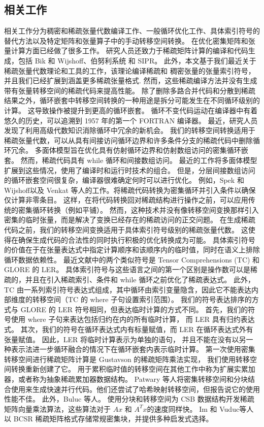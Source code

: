\begin{translation}
\section{相关工作}
相关工作分为稠密和稀疏张量代数编译工作、一般循环优化工作、具体索引符号的替代方法以及特定矩阵和张量算子中的手动转移空间转换。 在优化密集矩阵和张量计算方面已经做了很多工作。
研究人员还致力于稀疏矩阵计算的编译和代码生成，包括 Bik 和 Wijshoff、伯努利系统 和 SIPR。 此外，本文基于我们最近关于稀疏张量代数理论和工具的工作，该理论编译稀疏和
稠密张量的张量索引符号，并且我们已经扩展到涵盖更多稀疏张量格式. 然而，这些稀疏编译方法并没有生成带有张量转移空间的稀疏代码来提高性能。 
除了删除多路合并代码和分散到稀疏结果之外，循环嵌套中转移空间转换的一种用途是拆分可能发生在不同循环级别的计算。 这导致操作被提升到更高的循环嵌套。 
循环不变代码运动在编译器中有着悠久的历史，可以追溯到 1957 年的第一个 FORTRAN 编译器。 最近，研究人员发现了利用高级代数知识消除循环中冗余的新机会。 
我们的转移空间转换适用于稀疏张量代数，可以从具有间接访问循环边界和许多条件分支的稀疏代码中删除循环冗余。 
多面体模型旨在优化具有仿射循环边界和仿射数组访问的密集循环嵌套。 然而，稀疏代码具有 while 循环和间接数组访问。
最近的工作将多面体模型扩展到这些情况，使用了编译时和运行时技术的组合。 但是，分层间接数组访问的循环嵌套空间很复杂，编译器很难确定何时可以进行优化。 
例如，Spek 和 Wijshoff以及 Venkat 等人的工作。将稀疏代码转换为密集循环并引入条件以确保仅计算非零条目。 
这样，在将代码转换回对稀疏结构进行操作之前，可以应用传统的密集循环转换（例如平铺）。 
然而，这种技术并没有像转移空间变换那样引入密集的临时张量，而是解决了变换已经存在的稀疏访问的正交问题。 
在生成稀疏代码之前，我们的转移空间变换适用于具体索引符号级别的稀疏张量代数。 这使得在确保生成代码的合法性的同时执行积极的优化转换成为可能。 
具体索引符号的价值在于在张量表达式中指定计算顺序和该顺序内的临时值，同时在语义上排除循环数据依赖性。 最近文献中的两个类似符号是 Tensor Comprehensions (TC) 
和 GLORE 的 LER。 具体索引符号与这些语言之间的第一个区别是操作数可以是稀疏的，并且在引入稀疏索引、条件和 while 循环之前优化了稀疏表达式。 
此外，TC 由一系列索引符号表达式组成，其中循环由索引变量隐含，因此它不能表达内部维度的转移空间（TC 的 where 子句设置索引范围）。 
我们的符号表达排序的方式与 GLORE 的 LER 符号相同，但表达临时计算的方式不同。 首先，我们的符号使用 where 子句来表达包括归约在内的所有临时计算，
而 LER 具有归约表达式。 其次，我们的符号在循环表达式内有标量赋值，而 LER 在循环表达式外有张量赋值。 因此，LER 将临时计算表示为单独的语句，
并且不能在没有以另一种表示法进一步循环融合的情况下在循环嵌套内表示临时计算。 第一次使用密集转移空间进行稀疏矩阵计算是 Gustavson 的稀疏矩阵乘法实现，
我们使用转移空间转换重新创建了它。 用于累积临时值的转移空间在其他工作中称为扩展实累加器，或者称为抽象稀疏累加器数据结构。
Patwary 等人将密集转移空间和分块结合使用来生成快速并行代码。他们还尝试了哈希映射转移空间，但报告说它的使用性能不佳。 
此外，Buluc 等人。 使用分块和转移空间为 CSB 数据结构开发稀疏矩阵向量乘法算法，这些算法对于 $Ax$ 和 $A^T x$的速度同样快。
Im 和 Vuduc等人以 BCSR 稀疏矩阵格式存储常规密集块，并提供多种启发式选择。


\end{translation}
